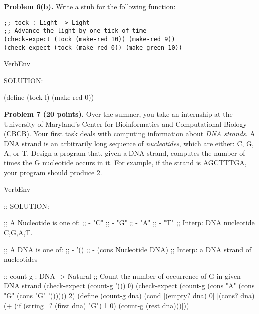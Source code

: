 \documentclass[12pt]{article}
\begin{document}
\noindent
{\bf Problem 6(b).} Write a stub for the following function:
    
\begin{verbatim}
;; tock : Light -> Light
;; Advance the light by one tick of time
(check-expect (tock (make-red 10)) (make-red 9))
(check-expect (tock (make-red 0)) (make-green 10))
\end{verbatim}


\begin{SaveVerbatim}{VerbEnv}
  
SOLUTION:

(define (tock l) (make-red 0))
        
\end{SaveVerbatim}


\newpage

\noindent
{\bf Problem 7 (20 points).}
%
Over the summer, you take an internship at the University of
Maryland's Center for Bioinformatics and Computational Biology (CBCB).
Your first task deals with computing information about \emph{DNA
  strands}.  A DNA strand is an arbitrarily long sequence of
\emph{nucleotides}, which are either: C, G, A, or T.  Design a program
that, given a DNA strand, computes the number of times the G
nucleotide occurs in it.  For example, if the strand is AGCTTTGA, your
program should produce 2.

\begin{SaveVerbatim}{VerbEnv}

;; SOLUTION:
  
;; A Nucleotide is one of:
;; - "C"
;; - "G"
;; - "A"
;; - "T"
;; Interp: DNA nucleotide C,G,A,T.

;; A DNA is one of:
;; - '()
;; - (cons Nucleotide DNA)
;; Interp: a DNA strand of nucleotides

;; count-g : DNA -> Natural
;; Count the number of occurrence of G in given DNA strand
(check-expect (count-g '()) 0)
(check-expect (count-g (cons "A" (cons "G" (cons "G" '())))) 2)
(define (count-g dna)
  (cond [(empty? dna) 0]
        [(cons? dna)
         (+ (if (string=? (first dna) "G") 1 0)
            (count-g (rest dna)))]))

\end{SaveVerbatim}

  
\newpage

\end{document}
